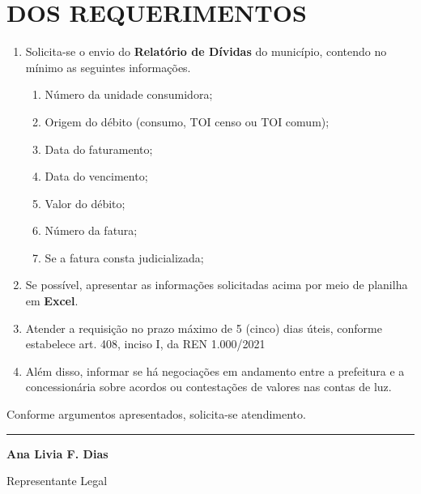 \documentclass[11pt,a4paper]{article}
\begin{document}


\section{DOS REQUERIMENTOS}

\begin{enumerate}[resume]
\item Solicita-se o envio do \textbf{Relatório de Dívidas} do município, contendo no mínimo as seguintes informações.
\begin{enumerate}
  \item Número da unidade consumidora;
  \item Origem do débito (consumo, TOI censo ou TOI comum);
  \item Data do faturamento;
  \item Data do vencimento;
  \item Valor do débito;
  \item Número da fatura;
  \item Se a fatura consta judicializada;
\end{enumerate}
\item Se possível, apresentar as informações solicitadas acima por meio de planilha em \textbf{Excel}.
\item Atender a requisição no prazo máximo de 5 (cinco) dias úteis, conforme estabelece art. 408, inciso I, da REN 1.000/2021
\item Além disso, informar se há negociações em andamento entre a prefeitura e a concessionária sobre acordos ou contestações de valores nas contas de luz.
\end{enumerate}

Conforme argumentos apresentados, solicita-se atendimento.

\vspace{2cm}
\begin{center}
\noindent\rule{6cm}{0.4pt}

\textbf{Ana Livia F. Dias}

{\small Representante Legal}
\end{center}
\end{document}
